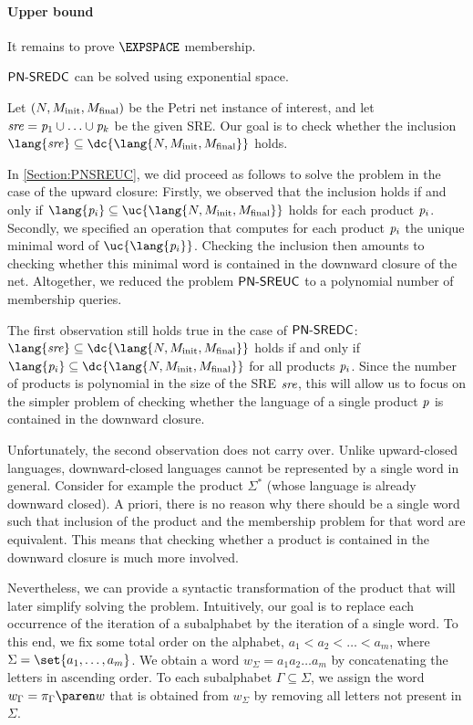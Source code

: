 \documentclass[../../diss.tex]{subfiles}
\begin{document}
\paragraph{Upper bound}

It remains to prove $\EXPSPACE$ membership.

\begin{theorem}%
\label{Theorem:PNSREDCMembership}%
    $\mathsf{PN\text{-}SREDC}$ can be solved using exponential space.
\end{theorem}

Let $(N,M_{\text{init}},M_{\text{final}})$ be the Petri net instance of interest, and let $\mathit{sre} = \mathit{p}_1 \cup \ldots \cup \mathit{p}_k$ be the given SRE.\@
Our goal is to check whether the inclusion $\lang{\sre} \subseteq \dc{\lang{N,\Minit,\Mfinal}}$ holds.

In \cref{Section:PNSREUC}, we did proceed as follows to solve the problem in the case of the upward closure:
Firstly, we observed that the inclusion holds if and only if $\lang{\product_i} \subseteq \uc{\lang{N,\Minit,\Mfinal}}$ holds for each product $\mathit{p}_i$.
Secondly, we specified an operation that computes for each product $\mathit{p}_i$ the unique minimal word of $\uc{\lang{\product_i}}$.
Checking the inclusion then amounts to checking whether this minimal word is contained in the downward closure of the net.
Altogether, we reduced the problem $\mathsf{PN\text{-}SREUC}$ to a polynomial number of membership queries.

The first observation still holds true in the case of $\mathsf{PN\text{-}SREDC}$:  $\lang{\sre} \subseteq \dc{\lang{N,\Minit,\Mfinal}}$ holds if and only if $\lang{\product_i} \subseteq \dc{\lang{N,\Minit,\Mfinal}}$ for all products $\mathit{p}_i$.
Since the number of products is polynomial in the size of the SRE $\mathit{sre}$, this will allow us to focus on the simpler problem of checking whether the language of a single product $\mathit{p}$ is contained in the downward closure.

Unfortunately, the second observation does not carry over.
Unlike upward-closed languages, downward-closed languages cannot be represented by a single word in general.
Consider for example the product $\Sigma^*$ (whose language is already downward closed).
A priori, there is no reason why there should be a single word such that inclusion of the product and the membership problem for that word are equivalent.
This means that checking whether a product is contained in the downward closure is much more involved.

Nevertheless, we can provide a syntactic transformation of the product that will later simplify solving the problem.
Intuitively, our goal is to replace each occurrence of the iteration of a subalphabet by the iteration of a single word.
To this end, we fix some total order on the alphabet, \eg $a_1 < a_2 < \ldots < a_m$, where $\Sigma = \set{a_1, \ldots, a_m}$.
We obtain a word $w_\Sigma = a_1 a_2 \ldots a_m$ by concatenating the letters in ascending order.
To each subalphabet $\Gamma \subseteq \Sigma$, we assign the word $w_\Gamma = \proj{\Gamma}{w}$ that is obtained from $w_\Sigma$ by removing all letters not present in $\Sigma$.
\end{document}
